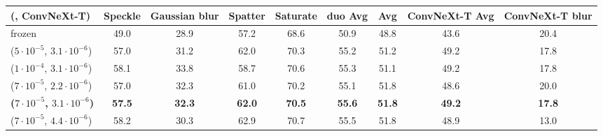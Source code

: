 \begin{tabular}{@{}l cccc cccc@{}}
\toprule
(\vit{}, ConvNeXt-T) & Speckle & Gaussian blur & Spatter & Saturate & duo Avg & \vit{} Avg & ConvNeXt-T Avg & ConvNeXt-T blur \\
\midrule
frozen & 49.0 & 28.9 & 57.2 & 68.6 & 50.9 & 48.8 & 43.6 & 20.4 \\
\midrule
($5{\cdot}10^{-5}$, $3.1{\cdot}10^{-6}$) & 57.0 & 31.2 & 62.0 & 70.3 & 55.2 & 51.2 & 49.2 & 17.8 \\
($1{\cdot}10^{-4}$, $3.1{\cdot}10^{-6}$) & 58.1 & 33.8 & 58.7 & 70.6 & 55.3 & 51.1 & 49.2 & 17.8 \\
($7{\cdot}10^{-5}$, $2.2{\cdot}10^{-6}$) & 57.0 & 32.3 & 61.0 & 70.2 & 55.1 & 51.8 & 48.6 & 20.0 \\
\textbf{($7{\cdot}10^{-5}$, $3.1{\cdot}10^{-6}$)} & \textbf{57.5} & \textbf{32.3} & \textbf{62.0} & \textbf{70.5} & \textbf{55.6} & \textbf{51.8} & \textbf{49.2} & \textbf{17.8} \\
($7{\cdot}10^{-5}$, $4.4{\cdot}10^{-6}$) & 58.2 & 30.3 & 62.9 & 70.7 & 55.5 & 51.8 & 48.9 & 13.0 \\
\bottomrule
\end{tabular}
